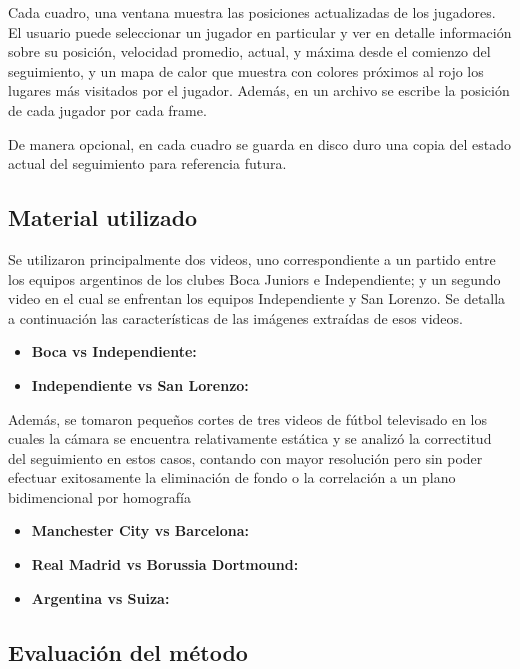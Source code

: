 Cada cuadro, una ventana muestra las posiciones actualizadas de los jugadores. El usuario puede seleccionar un jugador en particular y ver en detalle información sobre su posición, velocidad promedio, actual, y máxima desde el comienzo del seguimiento, y un mapa de calor que muestra con colores próximos al rojo los lugares más visitados por el jugador. Además, en un archivo se escribe la posición de cada jugador por cada frame.

De manera opcional, en cada cuadro se guarda en disco duro una copia del estado actual del seguimiento para referencia futura.

\subsection{Material utilizado}

Se utilizaron principalmente dos videos, uno correspondiente a un partido entre los equipos argentinos de los clubes Boca Juniors e Independiente; y un segundo video en el cual se enfrentan los equipos Independiente y San Lorenzo. Se detalla a continuación las características de las imágenes extraídas de esos videos.

\begin{itemize}
  \item \textbf{Boca vs Independiente:}
  \item \textbf{Independiente vs San Lorenzo:}
\end{itemize}

Además, se tomaron pequeños cortes de tres videos de fútbol televisado en los cuales la cámara se encuentra relativamente estática y se analizó la correctitud del seguimiento en estos casos, contando con mayor resolución pero sin poder efectuar exitosamente la eliminación de fondo o la correlación a un plano bidimencional por homografía %

\begin{itemize}
  \item \textbf{Manchester City vs Barcelona:}
  \item \textbf{Real Madrid vs Borussia Dortmound:}
  \item \textbf{Argentina vs Suiza:}
\end{itemize}

\subsection{Evaluación del método}

